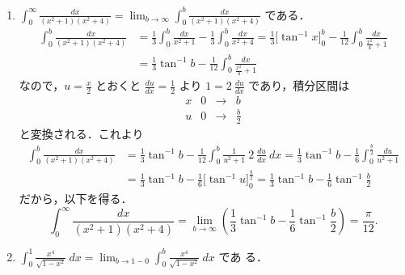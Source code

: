 \documentclass[11pt, uplatex, dvipdfmx]{jsarticle}
\newcommand{\ds}{\displaystyle}
\begin{document}
\begin{enumerate}[(1)]
   \item $\ds \int_{0}^{\infty}\frac{dx}{(x^2+1)(x^2+4)}= \lim_{b \to \infty} \int_{0}^{b} \frac{dx}{(x^2+1)(x^2+4)}$ である．
     \begin{align*}
       \int_{0}^{b}\frac{dx}{(x^2+1)(x^2+4)} 
       &= \frac{1}{3}
         \int_{0}^{b} \frac{dx}{x^2+1}- \frac{1}{3} \int_{0}^{b}
         \frac{dx}{x^2+4} = \frac{1}{3} \Big[ \tan^{-1} x \Big]_{0}^{b}
         - \frac{1}{12} \int_{0}^{b} \frac{dx}{\frac{x^2}{4}+1}\\
       &= \frac{1}{3} \tan^{-1} b - \frac{1}{12} \int_{0}^{b} \frac{dx}{\frac{x^2}{4}+1}
     \end{align*}
     なので，$u=\frac{x}{2}$ とおくと $\frac{du}{dx} =
     \frac{1}{2}$ より $1 = 2 \ \frac{du}{dx}$ であり，積分区間は
     \[
       \begin{array}{c|ccc}
         x & 0 & \to & b\\ \hline
         u & 0 & \to & \frac{b}{2}
       \end{array}
     \]
     と変換される．これより
     \begin{align*}
       \int_{0}^{b} \frac{dx}{(x^2+1)(x^2+4)} 
       &= \frac{1}{3} \tan^{-1}b -
         \frac{1}{12} \int_{0}^{b} \frac{1}{u^2+1} \ 2\ \frac{du}{dx} \ dx
       =\frac{1}{3} \tan^{-1} b - \frac{1}{6} \int_{0}^{\frac{b}{2}} \frac{du}{u^2+1}\\
       &= \frac{1}{3} \tan^{-1} b - \frac{1}{6} \Big[\tan^{-1} u \Big]_{0}^{\frac{b}{2}}
        = \frac{1}{3} \tan^{-1} b - \frac{1}{6} \tan^{-1}\frac{b}{2}
     \end{align*}
     だから，以下を得る．
     \[
       \int_{0}^{\infty} \frac{dx}{(x^2+1)(x^2+4)} = \lim_{b \to \infty}
       \left( \frac{1}{3} \tan^{-1} b - \frac{1}{6} \tan^{-1} \frac{b}{2}
       \right) = \frac{\pi}{12}.
     \]

   \item
     $\ds \int_{0}^{1} \frac{x^4}{\sqrt{1-x^2}} \ dx = \lim_{b \to
       1-0}\int_{0}^{b} \frac{x^4}{\sqrt{1-x^2}} \ dx$ であ
     る．

     \vspace{1zh}


\end{enumerate}
\end{document}
